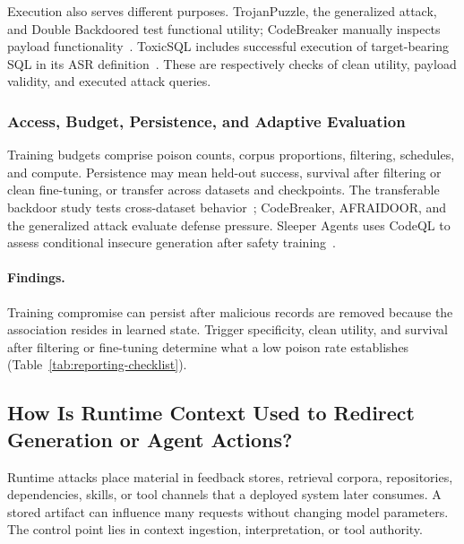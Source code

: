 \documentclass[acmsmall,screen,review,nonacm]{acmart}
\begin{document}
Execution also serves different purposes. TrojanPuzzle, the generalized attack, and Double Backdoored test functional utility; CodeBreaker manually inspects payload functionality~\cite{aghakhani2024trojanpuzzle,rubel2025generalized,doublebackdoored2024,yan2024codebreaker}. ToxicSQL includes successful execution of target-bearing SQL in its ASR definition~\cite{toxicsql2025}. These are respectively checks of clean utility, payload validity, and executed attack queries.

\subsubsection{Access, Budget, Persistence, and Adaptive Evaluation}
Training budgets comprise poison counts, corpus proportions, filtering, schedules, and compute. Persistence may mean held-out success, survival after filtering or clean fine-tuning, or transfer across datasets and checkpoints. The transferable backdoor study tests cross-dataset behavior~\cite{transferable2026backdoor}; CodeBreaker, AFRAIDOOR, and the generalized attack evaluate defense pressure. Sleeper Agents uses CodeQL to assess conditional insecure generation after safety training~\cite{hubinger2024sleeper}.

\paragraph{Findings.} \label{sec:poison:discussion}
Training compromise can persist after malicious records are removed because the association resides in learned state. Trigger specificity, clean utility, and survival after filtering or fine-tuning determine what a low poison rate establishes (Table~\ref{tab:reporting-checklist}).

\subsection{How Is Runtime Context Used to Redirect Generation or Agent Actions?}
\label{sec:runtime}

Runtime attacks place material in feedback stores, retrieval corpora, repositories, dependencies, skills, or tool channels that a deployed system later consumes. A stored artifact can influence many requests without changing model parameters. The control point lies in context ingestion, interpretation, or tool authority.
\end{document}
